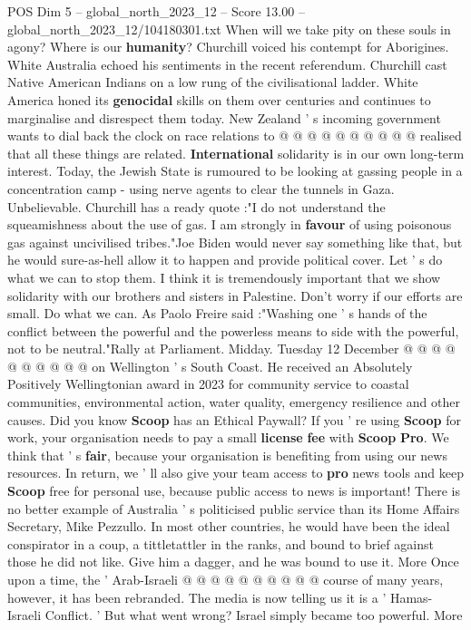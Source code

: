 \begin{textsample}{POS Dim 5 – global\_north\_2023\_12 – Score 13.00 – global\_north\_2023\_12/104180301.txt}
When will we take pity on these souls in agony?
Where is our \textbf{humanity}?
Churchill voiced his contempt for Aborigines.
White Australia echoed his sentiments in the recent referendum.
Churchill cast Native American Indians on a low rung of the civilisational ladder.
White America honed its \textbf{genocidal} skills on them over centuries and continues to marginalise and disrespect them today.
New Zealand ' s incoming government wants to dial back the clock on race relations to @ @ @ @ @ @ @ @ @ @ realised that all these things are related. \textbf{International} solidarity is in our own long-term interest.
Today, the Jewish State is rumoured to be looking at gassing people in a concentration camp - using nerve agents to clear the tunnels in Gaza.
Unbelievable.
Churchill has a ready quote :"I do not understand the squeamishness about the use of gas.
I am strongly in \textbf{favour} of using poisonous gas against uncivilised tribes."Joe Biden would never say something like that, but he would sure-as-hell allow it to happen and provide political cover.
Let ' s do what we can to stop them.
I think it is tremendously important that we show solidarity with our brothers and sisters in Palestine.
Don't worry if our efforts are small.
Do what we can.
As Paolo Freire said :"Washing one ' s hands of the conflict between the powerful and the powerless means to side with the powerful, not to be neutral."Rally at Parliament.
Midday.
Tuesday 12 December @ @ @ @ @ @ @ @ @ @ on Wellington ' s South Coast.
He received an Absolutely Positively Wellingtonian award in 2023 for community service to coastal communities, environmental action, water quality, emergency resilience and other causes.
Did you know \textbf{Scoop} has an Ethical Paywall?
If you ' re using \textbf{Scoop} for work, your organisation needs to pay a small \textbf{license} \textbf{fee} with \textbf{Scoop} \textbf{Pro}.
We think that ' s \textbf{fair}, because your organisation is benefiting from using our news resources.
In return, we ' ll also give your team access to \textbf{pro} news tools and keep \textbf{Scoop} free for personal use, because public access to news is important!
There is no better example of Australia ' s politicised public service than its Home Affairs Secretary, Mike Pezzullo.
In most other countries, he would have been the ideal conspirator in a coup, a tittletattler in the ranks, and bound to brief against those he did not like.
Give him a dagger, and he was bound to use it.
More Once upon a time, the ' Arab-Israeli @ @ @ @ @ @ @ @ @ @ course of many years, however, it has been rebranded.
The media is now telling us it is a ' Hamas-Israeli Conflict. ' But what went wrong?
Israel simply became too powerful.
More

\end{textsample}
